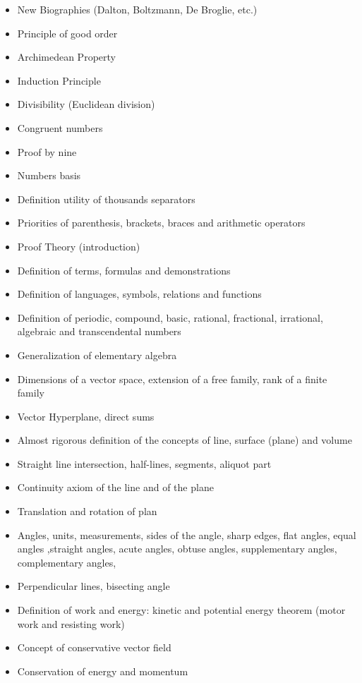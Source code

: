 \documentclass[12pt,a4paper,twoside,openright]{report}
\newcounter{def}
\newcounter{quot}
\theoremstyle{definition}
\theoremstyle{itexmp}
\numberwithin{equation}{section}
\begin{document}
\begin{itemize}
\begin{itemize}[noitemsep]
				\item New Biographies (Dalton, Boltzmann, De Broglie, etc.)
				\item Principle of good order
				\item Archimedean Property
				\item Induction Principle
				\item Divisibility (Euclidean division)
				\item Congruent numbers
				\item Proof by nine
				\item Numbers basis
				\item Definition utility of thousands separators
				\item Priorities of parenthesis, brackets, braces and arithmetic operators
				\item Proof Theory (introduction)
				\item Definition of terms, formulas and demonstrations
				\item Definition of languages, symbols, relations and functions
				\item Definition of periodic, compound, basic, rational, fractional, irrational, algebraic and transcendental numbers
				\item Generalization of elementary algebra
				\item Dimensions of a vector space, extension of a free family, rank of a finite family
				\item Vector Hyperplane, direct sums
				\item Almost rigorous definition of the concepts of line, surface (plane) and volume
				\item Straight line intersection, half-lines, segments, aliquot part
				\item Continuity axiom of the line and of the plane
				\item Translation and rotation of plan
				\item Angles, units, measurements, sides of the angle, sharp edges, flat angles, equal angles ,straight angles, acute angles, obtuse angles, supplementary angles, complementary angles, 
				\item Perpendicular lines, bisecting angle
				\item Definition of work and energy: kinetic and potential energy theorem (motor work and resisting work)
				\item Concept of conservative vector field
				\item Conservation of energy and momentum

\end{itemize}
\end{itemize}
\end{document}
